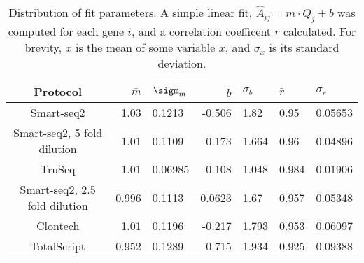 
\begin{table}[htdp]

\caption{Distribution of fit parameters. A simple linear fit,
             $\hat{A}_{ij} = m \cdot Q_{j} + b$
             was computed for each gene $i$, and a correlation coefficent $r$
             calculated.  For brevity,
             $\bar{x}$ is the mean of some variable $x$, and $\sigma_x$ is its
             standard deviation.  }
\begin{center}
\begin{tabular}{|c|r@{$\pm$}l|r@{$\pm$}l|}\hline 

Protocol & $\bar{m}$ & $\sigm_m$ & $\bar{b}$ & $\sigma_b$ & $\bar{r}$ & $\sigma_r$ \\\hline
Smart-seq2 & 1.03 & 0.1213 & -0.506 & 1.82 & 0.95 & 0.05653 \\
Smart-seq2, 5 fold dilution & 1.01 & 0.1109 & -0.173 & 1.664 & 0.96 & 0.04896 \\
TruSeq & 1.01 & 0.06985 & -0.108 & 1.048 & 0.984 & 0.01906 \\
Smart-seq2, 2.5 fold dilution & 0.996 & 0.1113 & 0.0623 & 1.67 & 0.957 & 0.05348 \\
Clontech & 1.01 & 0.1196 & -0.217 & 1.793 & 0.953 & 0.06097 \\
TotalScript & 0.952 & 0.1289 & 0.715 & 1.934 & 0.925 & 0.09388 \\
\hline
\end{tabular}
\label{tab:fits}
\end{center}
\end{table}



              